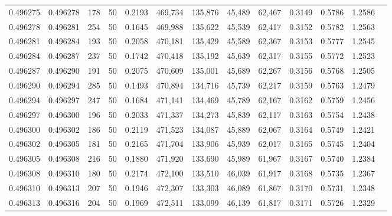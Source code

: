 \begin{tabular}{rrrrrrrrrrrrr}
0.496275 & 0.496278 &   178 &  50 &                                     0.2193 & 469,734 & 135,876 &  45,489 &  62,467 & 0.3149 & 0.5786 & 1.2586 \\
0.496278 & 0.496281 &   254 &  50 &                                     0.1645 & 469,988 & 135,622 &  45,539 &  62,417 & 0.3152 & 0.5782 & 1.2563 \\
0.496281 & 0.496284 &   193 &  50 &                                     0.2058 & 470,181 & 135,429 &  45,589 &  62,367 & 0.3153 & 0.5777 & 1.2545 \\
0.496284 & 0.496287 &   237 &  50 &                                     0.1742 & 470,418 & 135,192 &  45,639 &  62,317 & 0.3155 & 0.5772 & 1.2523 \\
0.496287 & 0.496290 &   191 &  50 &                                     0.2075 & 470,609 & 135,001 &  45,689 &  62,267 & 0.3156 & 0.5768 & 1.2505 \\
0.496290 & 0.496294 &   285 &  50 &                                     0.1493 & 470,894 & 134,716 &  45,739 &  62,217 & 0.3159 & 0.5763 & 1.2479 \\
0.496294 & 0.496297 &   247 &  50 &                                     0.1684 & 471,141 & 134,469 &  45,789 &  62,167 & 0.3162 & 0.5759 & 1.2456 \\
0.496297 & 0.496300 &   196 &  50 &                                     0.2033 & 471,337 & 134,273 &  45,839 &  62,117 & 0.3163 & 0.5754 & 1.2438 \\
0.496300 & 0.496302 &   186 &  50 &                                     0.2119 & 471,523 & 134,087 &  45,889 &  62,067 & 0.3164 & 0.5749 & 1.2421 \\
0.496302 & 0.496305 &   181 &  50 &                                     0.2165 & 471,704 & 133,906 &  45,939 &  62,017 & 0.3165 & 0.5745 & 1.2404 \\
0.496305 & 0.496308 &   216 &  50 &                                     0.1880 & 471,920 & 133,690 &  45,989 &  61,967 & 0.3167 & 0.5740 & 1.2384 \\
0.496308 & 0.496310 &   180 &  50 &                                     0.2174 & 472,100 & 133,510 &  46,039 &  61,917 & 0.3168 & 0.5735 & 1.2367 \\
0.496310 & 0.496313 &   207 &  50 &                                     0.1946 & 472,307 & 133,303 &  46,089 &  61,867 & 0.3170 & 0.5731 & 1.2348 \\
0.496313 & 0.496316 &   204 &  50 &                                     0.1969 & 472,511 & 133,099 &  46,139 &  61,817 & 0.3171 & 0.5726 & 1.2329 \\

\end{tabular}
